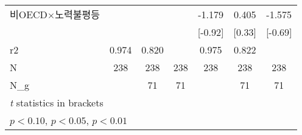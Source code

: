 \begin{tabular}{l*{6}{c}}
\addlinespace
비OECD$\times$노력불평등&                     &                     &                     &      -1.179         &       0.405         &      -1.575         \\
                    &                     &                     &                     &     [-0.92]         &      [0.33]         &     [-0.69]         \\
\midrule
r2                  &       0.974         &       0.820         &                     &       0.975         &       0.822         &                     \\
N                   &         238         &         238         &         238         &         238         &         238         &         238         \\
N\_g                 &                     &          71         &          71         &                     &          71         &          71         \\
\bottomrule
\multicolumn{7}{l}{\footnotesize \textit{t} statistics in brackets}\\
\multicolumn{7}{l}{\footnotesize \sym{*} \(p<0.10\), \sym{**} \(p<0.05\), \sym{***} \(p<0.01\)}\\
\end{tabular}
